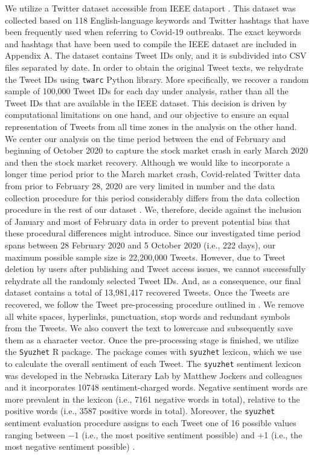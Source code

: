 We utilize a Twitter dataset accessible from IEEE dataport \parencite{lamsal2021design}. This dataset was collected based on 118 English-language keywords and Twitter hashtags that have been frequently used when referring to Covid-19 outbreaks. The exact keywords and hashtags that have been used to compile the IEEE dataset are included in Appendix A. The dataset contains Tweet IDs only, and it is subdivided into CSV files separated by date. 
In order to obtain the original Tweet texts, we rehydrate the Tweet IDs using \texttt{twarc} Python library. More specifically, we recover a random sample of 100,000 Tweet IDs for each day under analysis, rather than all the Tweet IDs that are available in the IEEE dataset. This decision is driven by computational limitations on one hand, and our objective to ensure an equal representation of Tweets from all time zones in the analysis on the other hand. 
We center our analysis on the time period between the end of February and beginning of October 2020 to capture the stock market crash in early March 2020 and then the stock market recovery. Although we would like to incorporate a longer time period prior to the March market crash, Covid-related Twitter data from prior to February 28, 2020 are very limited in number and the data collection procedure for this period considerably differs from the data collection procedure in the rest of our dataset \parencite{lamsal2021design}. We, therefore, decide against the inclusion of January and most of February data in order to prevent potential bias that these procedural differences might introduce.
Since our investigated time period spans between 28 February 2020 and 5 October 2020 (i.e., 222 days), our maximum possible sample size is 22,200,000 Tweets. However, due to Tweet deletion by users after publishing and Tweet access issues, we cannot successfully rehydrate all the randomly selected Tweet IDs. And, as a consequence, our final dataset contains a total of 13,981,417 recovered Tweets.
Once the Tweets are recovered, we follow the Tweet pre-processing procedure outlined in \textcite{rul2019guidetomining}. We remove all white spaces, hyperlinks, punctuation, stop words and redundant symbols from the Tweets. We also convert the text to lowercase and subsequently save them as a character vector. 
Once the pre-processing stage is finished, we utilize the \texttt{Syuzhet} R package. The package comes with \texttt{syuzhet} lexicon, which we use to calculate the overall sentiment of each Tweet. The \texttt{syuzhet} sentiment lexicon was developed in the Nebraska Literary Lab by Matthew Jockers and colleagues and it incorporates 10748 sentiment-charged words. Negative sentiment words are more prevalent in the lexicon (i.e., 7161 negative words in total), relative to the positive words (i.e., 3587 positive words in total). Moreover, the \texttt{syuzhet} sentiment evaluation procedure assigns to each Tweet one of 16 possible values ranging between −1 (i.e., the most positive sentiment possible) and +1 (i.e., the most negative sentiment possible) \parencite{jockers2017package}. 
